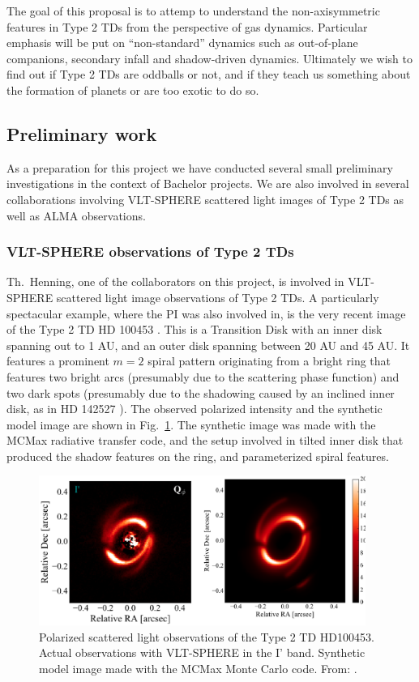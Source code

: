 \documentclass[10pt,fleqn,twoside]{article}
\begin{document}
The goal of this proposal is to attemp to understand the non-axisymmetric
features in Type 2 TDs from the perspective of gas dynamics. Particular
emphasis will be put on ``non-standard'' dynamics such as out-of-plane
companions, secondary infall and shadow-driven dynamics. Ultimately we wish
to find out if Type 2 TDs are oddballs or not, and if they teach us
something about the formation of planets or are too exotic to do so.


\subsection{Preliminary work}
As a preparation for this project we have conducted several small
preliminary investigations in the context of Bachelor projects. We are also
involved in several collaborations involving VLT-SPHERE scattered light
images of Type 2 TDs as well as ALMA observations.

\subsubsection{VLT-SPHERE observations of Type 2 TDs}
Th.~Henning, one of the collaborators on this project, is involved in
VLT-SPHERE scattered light image observations of Type 2 TDs. A particularly
spectacular example, where the PI was also involved in, is the very recent
image of the Type 2 TD HD 100453 \citep{2016arXiv161010089B}. This is a
Transition Disk with an inner disk spanning out to 1 AU, and an outer disk
spanning between 20 AU and 45 AU. It features a prominent $m=2$ spiral
pattern originating from a bright ring that features two bright arcs
(presumably due to the scattering phase function) and two dark spots
(presumably due to the shadowing caused by an inclined inner disk, as in HD
142527 \citep{2015ApJ...798L..44M}). The observed polarized intensity
and the synthetic model image are shown in Fig.~\ref{fig-benisty}. The
synthetic image was made with the MCMax radiative transfer code, and
the setup involved in tilted inner disk that produced the shadow features
on the ring, and parameterized spiral features.

\begin{figure}
\centerline{\includegraphics[width=0.95\textwidth]{D2Fig/Benisty.eps}}
\caption{\label{fig-benisty} Polarized scattered light observations of the
  Type 2 TD HD100453.  Actual observations with
  VLT-SPHERE in the I' band.  Synthetic model image
  made with the MCMax Monte Carlo code. From: \citet{2016arXiv161010089B}.}
\end{figure}
\end{document}
